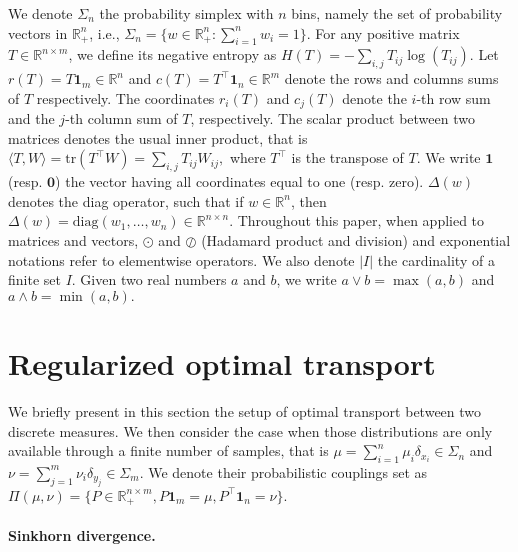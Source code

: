 \documentclass{article}
\newcommand{\inr}[1]{\langle #1 \rangle}
\newcommand{\R}{{\mathbb{R}}}
\begin{document}
We denote $\Sigma_n$ the probability simplex with $n$ bins, namely the set of probability vectors in $\R_+^n$, i.e., $\Sigma_n = \{w \in \R_+^n: \sum_{i=1}^n w_i = 1\}.$
For any positive matrix $T \in \R^{n\times m}$, we define its negative entropy as $H(T) = -\sum_{i,j} T_{ij} \log(T_{ij}).$
Let $r(T) = T\mathbf 1_m \in \R^n$ and $c(T) = T^\top\mathbf 1_n \in \R^m$ denote the rows and columns sums of $T$ respectively. The coordinates $r_i(T)$ and $c_j(T)$ denote the $i$-th row sum and the $j$-th column sum of $T$, respectively.
The scalar product between two matrices denotes the usual inner product, that is $\inr{T, W} = \text{tr}(T^\top W) = \sum_{i,j}T_{ij}W_{ij},$ where $T^\top$ is the transpose of $T$. 
We write $\mathbf{1}$ (resp. $\mathbf{0}$) the vector having all coordinates equal to one (resp. zero).
$\Delta(w)$ denotes the diag operator, such that if $w \in \R^n$, then $\Delta(w) = \text{diag}(w_1, \ldots, w_n)\in \R^{n\times n}$.
Throughout this paper, when applied to matrices and vectors,  $\odot$ and $\oslash$ (Hadamard product and division) and exponential notations refer to elementwise operators.
We also denote $|I|$ the cardinality of a finite set $I$.
Given two real numbers $a$ and $b$, we write $a\vee b = \max(a,b)$ and $a\wedge b = \min(a,b).$


\section{Regularized optimal transport}
\label{sec:optimal_transport}

 We briefly present in this section the setup of optimal transport between two discrete measures. We then consider the case when those distributions are only available through a finite number of samples, that is $\mu = \sum_{i=1}^n \mu_i \delta_{x_i} \in \Sigma_n$ and $\nu = \sum_{j=1}^m \nu_i \delta_{y_j} \in \Sigma_m$. 
We denote their probabilistic couplings set as $\Pi(\mu, \nu) = \{P \in \R_+^{n\times m}, P\mathbf{1}_m = \mu, P^\top \mathbf{1}_n = \nu\}.$ 
\paragraph{Sinkhorn divergence.}
\end{document}
